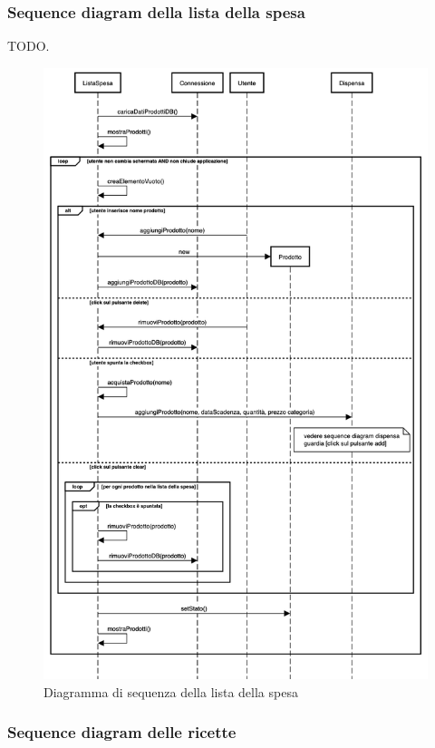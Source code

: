 \documentclass{article}
\begin{document}
\subsubsection{Sequence diagram della lista della spesa}

TODO.

\begin{figure}[H]
    \includegraphics[width=\linewidth]{images/sequence-shopping-list.png}
    \caption{Diagramma di sequenza della lista della spesa}
    \label{fig:seqshoplist}
\end{figure}

\subsubsection{Sequence diagram delle ricette}
\end{document}
